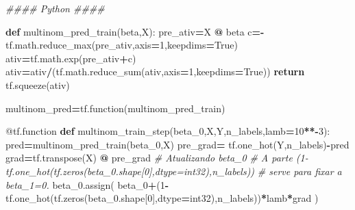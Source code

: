 \documentclass[
]{article}
\newenvironment{Shaded}{\begin{snugshade}}{\end{snugshade}}
\newcommand{\AttributeTok}[1]{\textcolor[rgb]{0.77,0.63,0.00}{#1}}
\newcommand{\CommentTok}[1]{\textcolor[rgb]{0.56,0.35,0.01}{\textit{#1}}}
\newcommand{\ControlFlowTok}[1]{\textcolor[rgb]{0.13,0.29,0.53}{\textbf{#1}}}
\newcommand{\DecValTok}[1]{\textcolor[rgb]{0.00,0.00,0.81}{#1}}
\newcommand{\KeywordTok}[1]{\textcolor[rgb]{0.13,0.29,0.53}{\textbf{#1}}}
\newcommand{\NormalTok}[1]{#1}
\newcommand{\OperatorTok}[1]{\textcolor[rgb]{0.81,0.36,0.00}{\textbf{#1}}}
\newcommand{\StringTok}[1]{\textcolor[rgb]{0.31,0.60,0.02}{#1}}
\newcommand{\VariableTok}[1]{\textcolor[rgb]{0.00,0.00,0.00}{#1}}
\begin{document}
\begin{Shaded}
\begin{Highlighting}[]
\CommentTok{\#\#\#\# Python \#\#\#\#}

\KeywordTok{def}\NormalTok{ multinom\_pred\_train(beta,X):}
\NormalTok{  pre\_ativ}\OperatorTok{=}\NormalTok{X }\OperatorTok{@}\NormalTok{ beta}
\NormalTok{  c}\OperatorTok{={-}}\NormalTok{tf.math.reduce\_max(pre\_ativ,axis}\OperatorTok{=}\DecValTok{1}\NormalTok{,keepdims}\OperatorTok{=}\VariableTok{True}\NormalTok{)}
\NormalTok{  ativ}\OperatorTok{=}\NormalTok{tf.math.exp(pre\_ativ}\OperatorTok{+}\NormalTok{c)}
\NormalTok{  ativ}\OperatorTok{=}\NormalTok{ativ}\OperatorTok{/}\NormalTok{(tf.math.reduce\_sum(ativ,axis}\OperatorTok{=}\DecValTok{1}\NormalTok{,keepdims}\OperatorTok{=}\VariableTok{True}\NormalTok{))}
  \ControlFlowTok{return}\NormalTok{ tf.squeeze(ativ)}

\NormalTok{multinom\_pred}\OperatorTok{=}\NormalTok{tf.function(multinom\_pred\_train)}

\AttributeTok{@tf.function}
\KeywordTok{def}\NormalTok{ multinom\_train\_step(beta\_0,X,Y,n\_labels,lamb}\OperatorTok{=}\DecValTok{10}\OperatorTok{**{-}}\DecValTok{3}\NormalTok{):}
\NormalTok{  pred}\OperatorTok{=}\NormalTok{multinom\_pred\_train(beta\_0,X)}
\NormalTok{  pre\_grad}\OperatorTok{=}\NormalTok{ tf.one\_hot(Y,n\_labels)}\OperatorTok{{-}}\NormalTok{pred}
\NormalTok{  grad}\OperatorTok{=}\NormalTok{tf.transpose(X) }\OperatorTok{@}\NormalTok{ pre\_grad}
  \CommentTok{\# Atualizando beta\_0}
  \CommentTok{\# A parte (1{-}tf.one\_hot(tf.zeros(beta\_0.shape[0],dtype=\textquotesingle{}int32\textquotesingle{}),n\_labels))}
  \CommentTok{\# serve para fixar a beta\_1=0.}
\NormalTok{  beta\_0.assign(}
\NormalTok{    beta\_0}\OperatorTok{+}\NormalTok{(}\DecValTok{1}\OperatorTok{{-}}\NormalTok{tf.one\_hot(tf.zeros(beta\_0.shape[}\DecValTok{0}\NormalTok{],dtype}\OperatorTok{=}\StringTok{\textquotesingle{}int32\textquotesingle{}}\NormalTok{),n\_labels))}\OperatorTok{*}\NormalTok{lamb}\OperatorTok{*}\NormalTok{grad}
\NormalTok{    )}


\end{Highlighting}
\end{Shaded}
\end{document}
